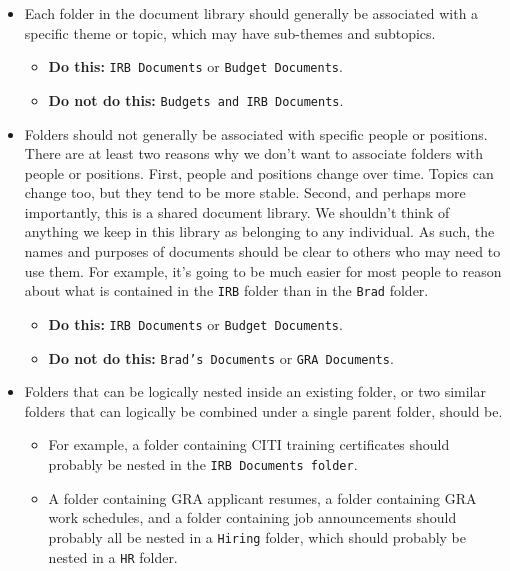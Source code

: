 \documentclass[
  letterpaper,
  DIV=11,
  numbers=noendperiod]{scrreprt}
\providecommand{\tightlist}{%
  \setlength{\itemsep}{0pt}\setlength{\parskip}{0pt}}\usepackage{longtable,booktabs,array}
\begin{document}
\begin{itemize}
\tightlist
\item
  Each folder in the document library should generally be associated
  with a specific theme or topic, which may have sub-themes and
  subtopics.

  \begin{itemize}
  \tightlist
  \item
    \textbf{Do this:} \texttt{IRB\ Documents} or
    \texttt{Budget\ Documents}.
  \item
    \textbf{Do not do this:} \texttt{Budgets\ and\ IRB\ Documents}.
  \end{itemize}
\item
  Folders should not generally be associated with specific people or
  positions. There are at least two reasons why we don't want to
  associate folders with people or positions. First, people and
  positions change over time. Topics can change too, but they tend to be
  more stable. Second, and perhaps more importantly, this is a shared
  document library. We shouldn't think of anything we keep in this
  library as belonging to any individual. As such, the names and
  purposes of documents should be clear to others who may need to use
  them. For example, it's going to be much easier for most people to
  reason about what is contained in the \texttt{IRB} folder than in the
  \texttt{Brad} folder.

  \begin{itemize}
  \tightlist
  \item
    \textbf{Do this:} \texttt{IRB\ Documents} or
    \texttt{Budget\ Documents}.
  \item
    \textbf{Do not do this:} \texttt{Brad’s\ Documents} or
    \texttt{GRA\ Documents}.
  \end{itemize}
\item
  Folders that can be logically nested inside an existing folder, or two
  similar folders that can logically be combined under a single parent
  folder, should be.

  \begin{itemize}
  \tightlist
  \item
    For example, a folder containing CITI training certificates should
    probably be nested in the \texttt{IRB\ Documents\ folder}.\\
  \item
    A folder containing GRA applicant resumes, a folder containing GRA
    work schedules, and a folder containing job announcements should
    probably all be nested in a \texttt{Hiring} folder, which should
    probably be nested in a \texttt{HR} folder.
  \end{itemize}
\end{itemize}
\end{document}

